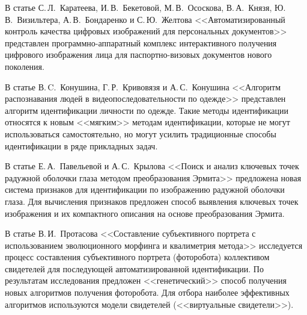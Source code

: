 \def\leftkol{\ } %

\def\rightkol{\ } %
      
      В статье С.\,Л.~Каратеева, И.\,В.~Бекетовой, М.\,В.~Ососкова, В.\,А.~Князя, Ю.\,В.~Визильтера, 
А.\,В.~Бондаренко и С.\,Ю.~Желтова <<Автоматизированный контроль качества цифровых 
изображений для персональных документов>> представлен программно-аппаратный комплекс интерактивного 
получения цифрового изображения лица для паспортно-визовых документов нового 
поколения.
      
      В статье В.\,C.~Конушина, Г.\,Р.~Кривовязя и А.\,С.~Конушина <<Алгоритм распознавания людей в видеопоследовательности по 
одежде>> представлен алгоритм 
идентификации личности по одежде. Такие методы идентификации относятся к новым 
<<мягким>> методам идентификации, которые не могут использоваться самостоятельно, но 
могут усилить традиционные способы идентификации в ряде прикладных задач.
      
      В статье Е.\,А.~Павельевой и А.\,С.~Крылова <<Поиск и анализ ключевых точек радужной оболочки глаза методом 
преобразования Эрмита>> предложена новая система признаков 
для идентификации по изображению радужной оболочки глаза. Для вычисления 
признаков предложен способ выявления ключевых точек изображения и их компактного 
описания на основе преобразования Эрмита. 
      
      В статье В.\,И.~Протасова <<Составление субъективного портрета с использованием 
эволюционного морфинга и квалиметрия метода>> исследуется процесс составления субъективного 
портрета (фоторобота) коллективом свидетелей для последующей автоматизированной 
идентификации. По результатам исследования предложен <<генетический>> способ 
получения новых алгоритмов получения фоторобота. Для отбора наиболее эффективных 
алгоритмов используются модели свидетелей (<<виртуальные свидетели>>). 
 \label{end\stat}      
      